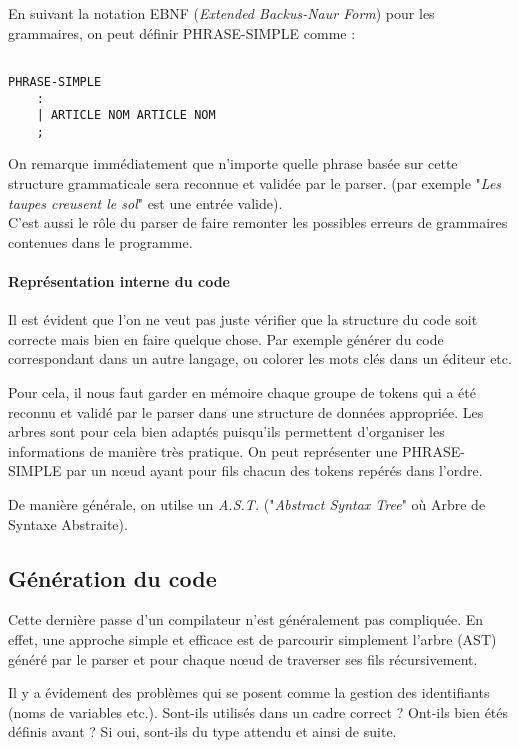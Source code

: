 \documentclass[14pt,a4paper]{article}
\begin{document}
	En suivant la notation EBNF (\textit{Extended Backus-Naur Form}) pour les grammaires, on peut définir PHRASE-SIMPLE comme :

	\begin{lstlisting}

PHRASE-SIMPLE
	:
	| ARTICLE NOM ARTICLE NOM
	;

	\end{lstlisting}

	On remarque immédiatement que n'importe quelle phrase basée sur cette structure grammaticale sera reconnue et validée par le parser. (par exemple "\textit{Les taupes creusent le sol}" est une entrée valide).\\
	
	C'est aussi le rôle du parser de faire remonter les possibles erreurs de grammaires contenues dans le programme.

	\paragraph{Représentation interne du code}

	Il est évident que l'on ne veut pas juste vérifier que la structure du code soit correcte mais bien en faire quelque chose. Par exemple générer du code correspondant dans un autre langage, ou colorer les mots clés dans un éditeur etc.
	
	Pour cela, il nous faut garder en mémoire chaque groupe de tokens qui a été reconnu et validé par le parser dans une structure de données appropriée. Les arbres sont pour cela bien adaptés puisqu'ils permettent d'organiser les informations de manière très pratique. On peut représenter une PHRASE-SIMPLE par un nœud ayant pour fils chacun des tokens repérés dans l'ordre.
	
	De manière générale, on utilse un \textit{A.S.T.} ("\textit{Abstract Syntax Tree}" où Arbre de Syntaxe Abstraite).
	\newpage
	
	\subsection{Génération du code}
	
	Cette dernière passe d'un compilateur n'est généralement pas compliquée. En effet, une approche simple et efficace est de parcourir simplement l'arbre (AST) généré par le parser et pour chaque nœud de traverser ses fils récursivement.
	
	Il y a évidement des problèmes qui se posent comme la gestion des identifiants (noms de variables etc.). Sont-ils utilisés dans un cadre correct ? Ont-ils bien étés définis avant ? Si oui, sont-ils du type attendu et ainsi de suite.\\
	
\end{document}
